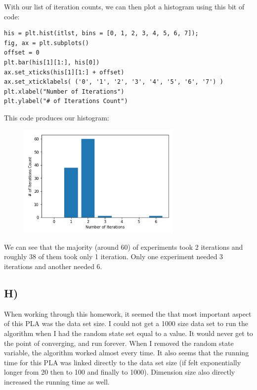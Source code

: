 \documentclass[a4paper]{article}
\begin{document}
With our list of iteration counts, we can then plot a histogram using this bit of code:
\begin{lstlisting}[frame=single]
his = plt.hist(itlst, bins = [0, 1, 2, 3, 4, 5, 6, 7]);
fig, ax = plt.subplots()
offset = 0
plt.bar(his[1][1:], his[0])
ax.set_xticks(his[1][1:] + offset)
ax.set_xticklabels( ('0', '1', '2', '3', '4', '5', '6', '7') )
plt.xlabel("Number of Iterations")
plt.ylabel("# of Iterations Count")
\end{lstlisting}
This code produces our histogram:
\begin{figure}[h]
  \begin{center}
    \includegraphics[width=80mm,scale=0.8]{problem14G.png}
  \end{center}
\end{figure}

We can see that the majority (around 60) of experiments took 2 iterations and roughly 38 of them took only 1 iteration. Only one experiment needed 3 iterations and another needed 6.
\subsection{H)}
When working through this homework, it seemed the that most important aspect of this PLA was the data set size. I could not get a 1000 size data set to run the algorithm when I had the random state set equal to a value. It would never get to the point of converging, and run forever. When I removed the random state variable, the algorithm worked almost every time. It also seems that the running time for this PLA was linked directly to the data set size (if felt exponentially longer from 20 then to 100 and finally to 1000). Dimension size also directly increased the running time as well.
\end{document}
